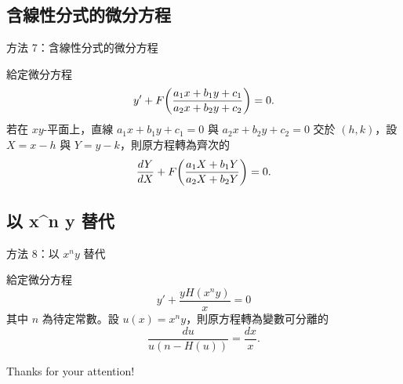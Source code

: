 \documentclass{beamer}
\newcommand{\Left} {\mathopen{}\mathclose\bgroup\left}
\newcommand{\Right}{\aftergroup\egroup\right}
\theoremstyle{remark}
\begin{document}
\begin{CJK}{UTF8}{bsmi}
\subsection[含線性分式]{含線性分式的微分方程}
\begin{frame}{方法 7：含線性分式的微分方程}
  \begin{theorem}
    給定微分方程
    \[y' + F \Left( \frac{a_1 x + b_1 y + c_1}{a_2 x + b_2 y + c_2} \Right) = 0.\]
    若在 $xy$-平面上，直線 $a_1 x + b_1 y + c_1 = 0$ 與 $a_2 x + b_2 y + c_2 = 0$ 交於 $(h,k)$，設 $X = x-h$ 與
    $Y = y-k$，則原方程轉為齊次的
    \[\frac{dY}{dX} + F \Left( \frac{a_1 X + b_1 Y}{a_2 X + b_2 Y} \Right) = 0.\]
  \end{theorem}
\end{frame}

\subsection[以 $x^n y$ 替代]{以 x\textasciicircum n y 替代}
\begin{frame}{方法 8：以 $x^n y$ 替代}
  \begin{theorem}
    給定微分方程
    \[y' + \frac{y H(x^n y)}{x} = 0\]
    其中 $n$ 為待定常數。設 $u(x) = x^n y$，則原方程轉為變數可分離的
    \[\frac{du}{u \left( n - H(u) \right)} = \frac{dx}{x}.\]
  \end{theorem}
\end{frame}

\begin{frame}
  \begin{center}
    \huge Thanks for your attention!
  \end{center}
\end{frame}
\end{CJK}
\end{document}
